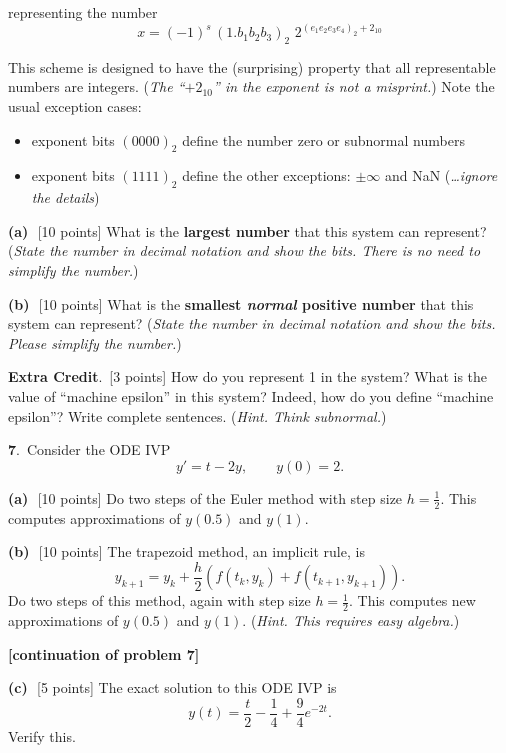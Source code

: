 \documentclass[11pt]{amsart}
\newcommand{\prob}[1]{\bigskip\noindent\large\textbf{#1}.\,\normalsize }
\newcommand{\epart}[1]{\medskip\noindent\textbf{(#1)}\,\, }
\newcommand{\pts}[1]{\scriptsize [#1 points] \normalsize}
\begin{document}
\noindent representing the number
\medskip\large
	$$x = (-1)^s\,(1.b_1 b_2 b_3)_2 \,\, 2^{(e_1 e_2 e_3 e_4)_2 + 2_{10}}$$
\normalsize

\noindent This scheme is designed to have the (surprising) property that all representable numbers are integers.  (\emph{The ``$+2_{10}$'' in the exponent is \emph{not} a misprint.})  Note the usual exception cases:
\begin{itemize}
\item exponent bits $(0000)_2$ define the number zero or subnormal numbers
\item exponent bits $(1111)_2$ define the other exceptions: $\pm\infty$ and NaN (\emph{\dots ignore the details})
\end{itemize}

\epart{a}  \pts{10}  What is the \textbf{largest number} that this system can represent?  (\emph{State the number in decimal notation and show the bits.  There is no need to simplify the number.})
\vfill

\epart{b}  \pts{10}  What is the \textbf{smallest \emph{normal} positive number} that this system can represent?  (\emph{State the number in decimal notation and show the bits. Please simplify the number.})
\vfill

\prob{Extra Credit}  \pts{3}  How do you represent 1 in the system?  What is the value of ``machine epsilon'' in this system?  Indeed, how do you define ``machine epsilon''?  Write complete sentences.  (\emph{Hint.  Think subnormal.})
\vfill


\newpage
\prob{7}  Consider the ODE IVP
	$$y' = t - 2y, \qquad y(0)=2.$$

\epart{a} \pts{10}  Do two steps of the Euler method with step size $h=\frac{1}{2}$.  This computes approximations of $y(0.5)$ and $y(1)$.
\vspace{3.0in}

\epart{b} \pts{10}  The trapezoid method, an implicit rule, is
    $$y_{k+1} = y_k + \frac{h}{2} \left(f(t_k,y_k) + f(t_{k+1},y_{k+1})\right).$$
Do two steps of this method, again with step size $h=\frac{1}{2}$.  This computes new approximations of $y(0.5)$ and $y(1)$.  (\emph{Hint. This requires easy algebra.})
\vfill

\newpage
\noindent \textbf{[continuation of problem 7]}

\medskip
\epart{c} \pts{5}  The exact solution to this ODE IVP is
    $$y(t)=\frac{t}{2} - \frac{1}{4} + \frac{9}{4} e^{-2t}.$$
Verify this.
\vspace{2.5in}
\end{document}
